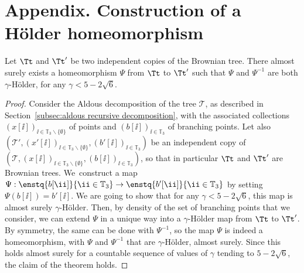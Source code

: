 \appendix

\section*{Appendix. Construction of a Hölder homeomorphism}
\label{app:construction of homeomorphism}

\begin{theorem}\label{thm:existence_holder_homeomorphism}
Let $\Tt$ and $\Tt'$ be two independent copies of the Brownian tree.
There almost surely exists a homeomorphism $\Psi$ from $\Tt$ to $\Tt'$ such that $\Psi$ and $\Psi^{-1}$ are both $\gamma$-Hölder, for any $\gamma < 5-2\sqrt{6}$.
\end{theorem}
\begin{proof}
Consider the Aldous decomposition of the tree $\mathcal{T}$, as described in Section~\ref{subsec:aldous recursive decomposition}, with the associated collections $(x[\ii])_{\ii \in \mathbb{T}_3 \backslash \{ \emptyset\}}$ of points and $(b[\ii])_{\ii\in \mathbb T_3}$ of branching points.
Let also $\left( \mathcal{T}', (x'[\ii])_{\ii \in \mathbb{T}_3 \backslash \{ \emptyset\}}, (b'[\ii])_{\ii\in \mathbb T_3} \right)$ be an independent copy of $\left( \mathcal{T}, (x[\ii])_{\ii \in \mathbb{T}_3 \backslash \{ \emptyset\}}, (b[\ii])_{\ii\in \mathbb T_3} \right)$, so that in particular $\Tt$ and $\Tt'$ are Brownian trees.
We~construct a map $\Psi : \enstq{b[\ii]}{ \ii\in \mathbb T_3} \rightarrow \enstq{b'[\ii]}{\ii\in \mathbb T_3}$ by setting $\Psi(b[\ii])= b'[\ii]$.
We are going to show that for any $\gamma < 5-2\sqrt{6}$, this map is almost surely $\gamma$-Hölder.
Then, by density of the set of branching points that we consider, we can extend $\Psi$ in a unique way into a $\gamma$-Hölder map from $\Tt$ to $\Tt'$.
By symmetry, the same can be done with $\Psi^{-1}$, so the map $\Psi$ is indeed a homeomorphism, with $\Psi$ and $\Psi^{-1}$ that are $\gamma$-Hölder, almost surely.
Since this holds almost surely for a countable sequence of values of $\gamma$ tending to $5-2\sqrt{6}$, the claim of the theorem holds.


\end{proof}

